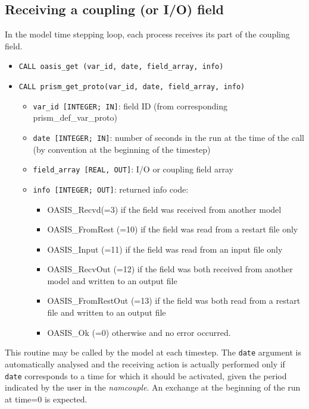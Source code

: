 \subsection{Receiving a coupling (or I/O) field}

In the model time stepping loop, each process
receives its part of the coupling field. 

\begin{itemize}
 
\item {\tt CALL oasis\_get       (var\_id, date, field\_array, info)}
\item {\tt CALL prism\_get\_proto(var\_id, date, field\_array, info)}
\begin{itemize}
\item {\tt var\_id [INTEGER; IN]}: field ID (from
  corresponding prism\_def\_var\_proto)
\item {\tt date [INTEGER; IN]}: number of seconds in the run at the
time of the call (by convention at the beginning of the timestep)
\item {\tt field\_array [REAL, OUT]}: I/O or coupling field array 
\item {\tt info [INTEGER; OUT]}: returned info code:
   \begin{itemize} 
      \item OASIS\_Recvd(=3) if the field was received from another model
      \item OASIS\_FromRest (=10) if the field was read from a restart
       file only
      \item OASIS\_Input (=11) if the field was read from an input
       file only
      \item OASIS\_RecvOut (=12) if the field was both received from
       another model and written to an output file
      \item OASIS\_FromRestOut (=13) if the field was both read from a
       restart file and written to an output file
      \item OASIS\_Ok (=0) otherwise and no error occurred.
   \end{itemize}
\end{itemize}
\end{itemize}

This routine may be called by the model at each timestep. The {\tt date}
argument is automatically analysed and the receiving action is actually
performed only if {\tt date} corresponds to a time for which it should
be activated, given the period indicated by the user in the
{\it namcouple}. An exchange at the beginning of the run at time=0 is
expected. 

